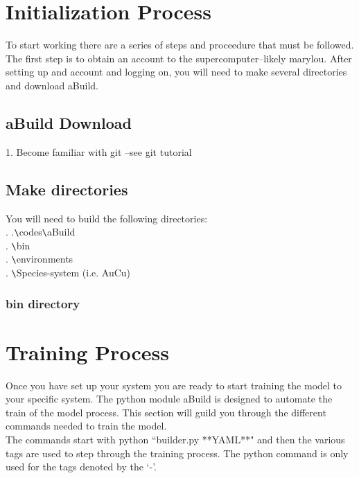 \documentclass{article}
\begin{document}
\section{Initialization Process}
To start working there are a series of steps and proceedure that must
be followed. The first step is to obtain an account to the supercomputer--likely
marylou. After setting up and account and logging on, you will need to
make several directories and download aBuild.  
\subsection{aBuild Download}
1. Become familiar with git --see git tutorial
\subsection{Make directories}
You will need to build the following directories:\\
. .\verb|\|codes\verb|\|aBuild\\
. \verb|\|bin\\
. \verb|\|environments\\
. \verb|\|Species-system (i.e. AuCu)

\subsubsection{bin directory}
\section{Training Process}                      
Once you have set up your system you are ready to start training the
model to your specific system. The python module aBuild is designed to
automate the train of the model process. This section will guild you
through the different commands needed to train the model.\\

The commands start with python ``builder.py **YAML**" and then the
various tags are used to step through the training process. The python
command is only used for the tags denoted by the `-'.
\end{document}
